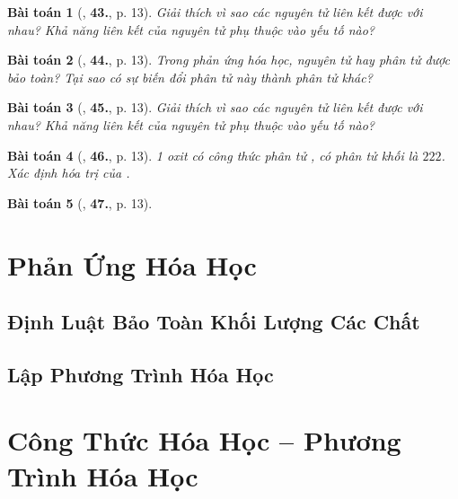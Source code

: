 \documentclass{article}
\numberwithin{equation}{section}
\newtheorem{baitoan}{Bài toán}[section]
\begin{document}
\begin{baitoan}[\cite{An2011}, \textbf{43.}, p. 13]
	Giải thích vì sao các nguyên tử liên kết được với nhau? Khả năng liên kết của nguyên tử phụ thuộc vào yếu tố nào?
\end{baitoan}

\begin{baitoan}[\cite{An2011}, \textbf{44.}, p. 13]
	Trong phản ứng hóa học, nguyên tử hay phân tử được bảo toàn? Tại sao có sự biến đổi phân tử này thành phân tử khác?
\end{baitoan}

\begin{baitoan}[\cite{An2011}, \textbf{45.}, p. 13]
	Giải thích vì sao các nguyên tử liên kết được với nhau? Khả năng liên kết của nguyên tử phụ thuộc vào yếu tố nào?
\end{baitoan}

\begin{baitoan}[\cite{An2011}, \textbf{46.}, p. 13]
	1 oxit có công thức phân tử , có phân tử khối là $222$. Xác định hóa trị của .
\end{baitoan}

\begin{baitoan}[\cite{An2011}, \textbf{47.}, p. 13]
	
\end{baitoan}



\section{Phản Ứng Hóa Học}

\subsection{Định Luật Bảo Toàn Khối Lượng Các Chất}


\subsection{Lập Phương Trình Hóa Học}


\section{Công Thức Hóa Học -- Phương Trình Hóa Học}
\end{document}
